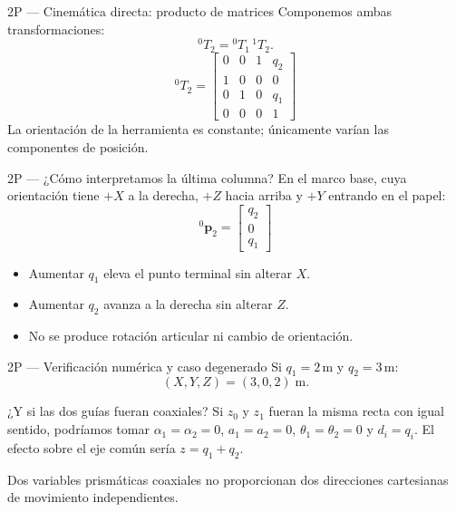 \documentclass[aspectratio=169,11pt]{beamer}
\begin{document}
\begin{frame}[t]{2P — Cinemática directa: producto de matrices}
 \small
 Componemos ambas transformaciones:
 \[
 {}^0T_2={}^0T_1\,{}^1T_2.
 \]
 \pause
 \[
 \boxed{{}^0T_2=
 \begin{bmatrix}
 0&0&1&q_2\\
 1&0&0&0\\
 0&1&0&q_1\\
 0&0&0&1
 \end{bmatrix}}
 \]
 \small La orientación de la herramienta es constante;
 únicamente varían las componentes de posición.
\end{frame}

\begin{frame}[t]{2P — ¿Cómo interpretamos la última columna?}
 \small
 En el marco base, cuya orientación tiene $+X$ a la derecha,
 $+Z$ hacia arriba y $+Y$ entrando en el papel:
 \[
 \boxed{{}^0\mathbf p_2=
 \begin{bmatrix}q_2\\0\\q_1\end{bmatrix}}
 \]
 \pause
 \begin{itemize}
  \item Aumentar $q_1$ eleva el punto terminal sin alterar $X$.
  \item Aumentar $q_2$ avanza a la derecha sin alterar $Z$.
  \item No se produce rotación articular ni cambio de orientación.
 \end{itemize}
\end{frame}

\begin{frame}[t]{2P — Verificación numérica y caso degenerado}
 \small
 Si $q_1=2\,\mathrm m$ y $q_2=3\,\mathrm m$:
 \[
 \boxed{(X,Y,Z)=(3,0,2)\;\mathrm m.}
 \]
 \pause
 \begin{block}{¿Y si las dos guías fueran coaxiales?}
 Si $z_0$ y $z_1$ fueran la misma recta con igual sentido,
 podríamos tomar $\alpha_1=\alpha_2=0$,
 $a_1=a_2=0$, $\theta_1=\theta_2=0$ y $d_i=q_i$.
 El efecto sobre el eje común sería $z=q_1+q_2$.
 \end{block}
 \small Dos variables prismáticas coaxiales no proporcionan
 dos direcciones cartesianas de movimiento independientes.
\end{frame}
\end{document}
